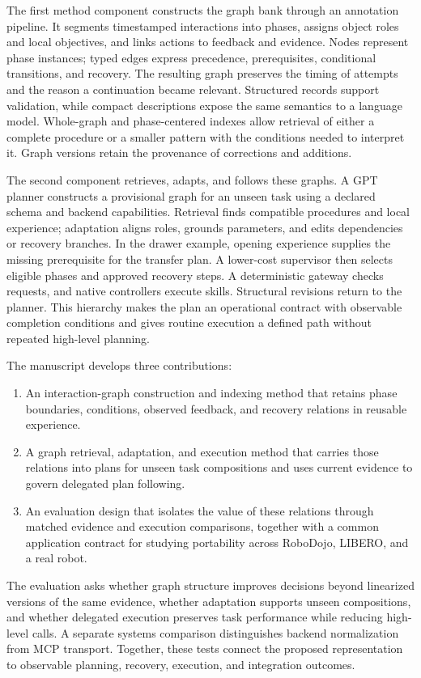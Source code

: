 The first method component constructs the graph bank through an annotation pipeline. It segments timestamped interactions into phases, assigns object roles and local objectives, and links actions to feedback and evidence. Nodes represent phase instances; typed edges express precedence, prerequisites, conditional transitions, and recovery. The resulting graph preserves the timing of attempts and the reason a continuation became relevant. Structured records support validation, while compact descriptions expose the same semantics to a language model. Whole-graph and phase-centered indexes allow retrieval of either a complete procedure or a smaller pattern with the conditions needed to interpret it. Graph versions retain the provenance of corrections and additions.

The second component retrieves, adapts, and follows these graphs. A GPT planner constructs a provisional graph for an unseen task using a declared schema and backend capabilities. Retrieval finds compatible procedures and local experience; adaptation aligns roles, grounds parameters, and edits dependencies or recovery branches. In the drawer example, opening experience supplies the missing prerequisite for the transfer plan. A lower-cost supervisor then selects eligible phases and approved recovery steps. A deterministic gateway checks requests, and native controllers execute skills. Structural revisions return to the planner. This hierarchy makes the plan an operational contract with observable completion conditions and gives routine execution a defined path without repeated high-level planning.

The manuscript develops three contributions:
\begin{enumerate}
\item An interaction-graph construction and indexing method that retains phase boundaries, conditions, observed feedback, and recovery relations in reusable experience.
\item A graph retrieval, adaptation, and execution method that carries those relations into plans for unseen task compositions and uses current evidence to govern delegated plan following.
\item An evaluation design that isolates the value of these relations through matched evidence and execution comparisons, together with a common application contract for studying portability across RoboDojo, LIBERO, and a real robot.
\end{enumerate}

The evaluation asks whether graph structure improves decisions beyond linearized versions of the same evidence, whether adaptation supports unseen compositions, and whether delegated execution preserves task performance while reducing high-level calls. A separate systems comparison distinguishes backend normalization from MCP transport. Together, these tests connect the proposed representation to observable planning, recovery, execution, and integration outcomes.

